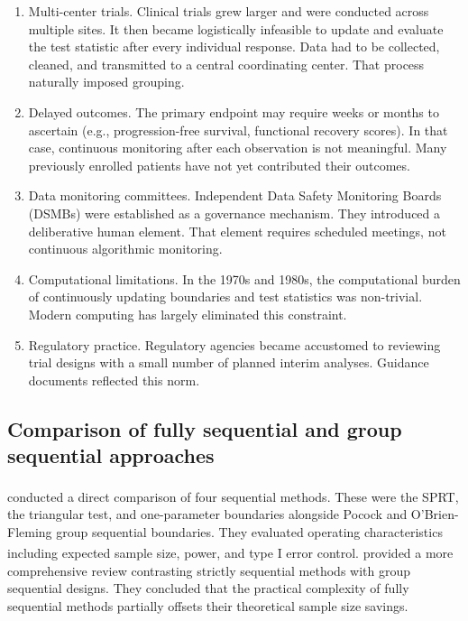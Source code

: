 \documentclass[
  11pt,
]{article}
\begin{document}
\begin{enumerate}
\def\labelenumi{\arabic{enumi}.}
\item
  Multi-center trials. Clinical trials grew larger
  and were conducted across multiple sites. It then
  became logistically infeasible to update and
  evaluate the test statistic after every individual
  response. Data had to be collected, cleaned, and
  transmitted to a central coordinating center. That
  process naturally imposed grouping.
\item
  Delayed outcomes. The primary endpoint may require
  weeks or months to ascertain (e.g., progression-free
  survival, functional recovery scores). In that case,
  continuous monitoring after each observation is not
  meaningful. Many previously enrolled patients have
  not yet contributed their outcomes.
\item
  Data monitoring committees. Independent Data Safety
  Monitoring Boards (DSMBs) were established as a
  governance mechanism. They introduced a deliberative
  human element. That element requires scheduled
  meetings, not continuous algorithmic monitoring.
\item
  Computational limitations. In the 1970s and 1980s,
  the computational burden of continuously updating
  boundaries and test statistics was non-trivial.
  Modern computing has largely eliminated this
  constraint.
\item
  Regulatory practice. Regulatory agencies became
  accustomed to reviewing trial designs with a small
  number of planned interim analyses. Guidance
  documents reflected this norm.
\end{enumerate}

\subsection{Comparison of fully sequential and group sequential approaches}\label{comparison-of-fully-sequential-and-group-sequential-approaches}

\textsuperscript{} conducted a direct comparison of
four sequential methods. These were the SPRT, the
triangular test, and one-parameter boundaries alongside
Pocock and O'Brien-Fleming group sequential boundaries.
They evaluated operating characteristics including
expected sample size, power, and type I error control.\textsuperscript{} provided a more comprehensive
review contrasting strictly sequential methods with
group sequential designs. They concluded that the
practical complexity of fully sequential methods
partially offsets their theoretical sample size
savings.
\end{document}

